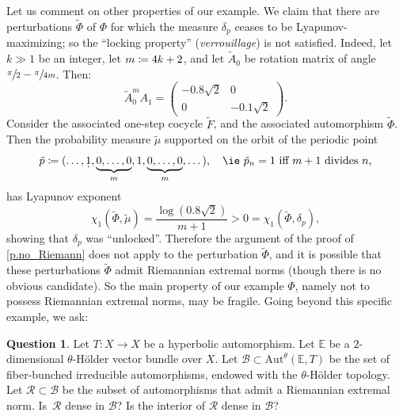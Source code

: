 \documentclass[10pt]{amsart}
\let\mathcal\mathscr
\def\vcentcolon{\mathrel{\mathop\ordinarycolon}}
\providecommand\ordinarycolon{:}
\providecommand*\coloneqq{\vcentcolon\mathrel{\mkern-1.2mu}=}
\newcommand{\underdot}[1]{\smash{\underset{\raisebox{3pt}{.}}{#1}}}
\theoremstyle{plain}
\theoremstyle{definition}
\newtheorem{question}[theorem]{Question}
\newcommand{\EE}{\mathbb{E}}
\newcommand{\cB}{\mathcal{B}}
\newcommand{\cR}{\mathcal{R}}
\newcommand{\Aut}{\mathrm{Aut}}
\begin{document}
\vspace*{-3pt}
Let us comment on other properties of our example.
We claim that there are perturbations $\tilde \Phi$ of $\Phi$ for which the measure $\delta_p$ ceases to be Lyapunov-maximizing; so the ``locking property'' (\emph{verrouillage}) is not satisfied.
Indeed, let $k \gg 1$ be an integer, let $m \coloneqq 4k+2$, and let $\tilde A_0$ be rotation matrix of angle $\sfrac{\pi}{2} - \sfrac{\pi}{4m}$.
Then:
\[
\tilde{A}_0^{m} A_1 = \begin{pmatrix} -0.8 \sqrt{2} & 0 \\ 0 & -0.1 \sqrt{2}\end{pmatrix}.
\]
Consider the associated one-step cocycle $\tilde F$, and the associated automorphism $\tilde \Phi$.
Then the probability measure $\tilde \mu$ supported on the orbit of the periodic point
\[
\tilde p \coloneqq
(\dots, \underdot{1}, \underbrace{0, \dots, 0}_m, 1, \underbrace{0, \dots, 0}_m, \dots), \quad \text{\ie $\tilde p_n = 1$ iff $m+1$ divides $n$,}
\]
has Lyapunov exponent
\[
\chi_1(\tilde\Phi, \tilde \mu) = \frac{\log(0.8 \sqrt{2})}{m+1} > 0 = \chi_1(\tilde\Phi, \delta_p),
\]
showing that $\delta_p$ was ``unlocked''.
Therefore the argument of the proof of \cref{p.no_Riemann} does not apply to the perturbation $\tilde\Phi$, and it is possible that these perturbations $\tilde \Phi$ admit Riemannian extremal norms (though there is no obvious candidate).
So the main property of our example $\Phi$, namely not to possess Riemannian extremal norms, may be fragile.
Going beyond this specific example, we ask:

\begin{question}
Let $T \colon X \to X$ be a hyperbolic automorphism.
Let $\EE$ be a $2$\nobreakdash-dimensional $\theta$-Hölder vector bundle over $X$.
Let $\cB \subset \Aut^\theta(\EE,T)$ be the set of fiber-bunched irreducible automorphisms, endowed with the $\theta$-Hölder topology.
Let $\cR \subset \cB$ be the subset of automorphisms that admit a Riemannian extremal norm.
Is~$\cR$ dense in $\cB$?
Is the interior of $\cR$ dense in $\cB$?
\end{question}
\end{document}
